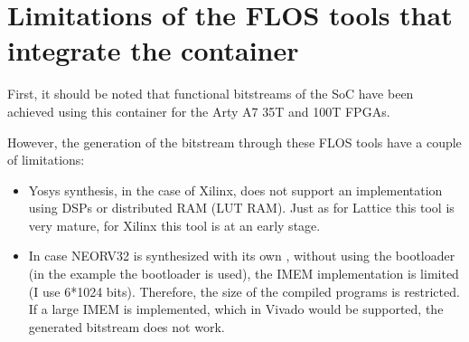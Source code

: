 \section{Limitations of the FLOS tools that integrate the container}

\label{limit}

First, it should be noted that functional bitstreams of the SoC have been achieved using this container for the Arty A7 35T and 100T FPGAs.

\vspace{5mm} 

\noindent However, the generation of the bitstream through these FLOS tools have a couple of limitations:

\begin{itemize}
\item Yosys synthesis, in the case of Xilinx, does not support an implementation using DSPs or distributed RAM (LUT RAM).
Just as for Lattice this tool is very mature, for Xilinx this tool is at an early stage.
\vspace{2mm}
\item In case NEORV32 is synthesized with its own , without using the bootloader (in the example the bootloader is used), the IMEM implementation is limited (I use 6*1024 bits). Therefore, the size of the compiled programs is restricted.
If a large IMEM is implemented, which in Vivado would be supported, the generated bitstream does not work.
\end{itemize}
